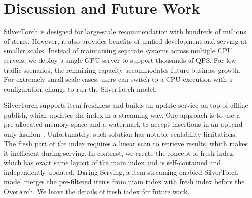\section{Discussion and Future Work}
\label{sec:7}
SilverTorch is designed for large-scale recommendation with hundreds of millions of items. However, it also provides benefits of unified development and serving at smaller scales. Instead of maintaining separate systems across multiple CPU servers, we deploy a single GPU server to support thousands of QPS. For low-traffic scenarios, the remaining capacity accommodates future business growth. For extremely small-scale cases, users can switch to a CPU execution with a configuration change to run the SilverTorch model.

SilverTorch supports item freshness and builds an update service on top of offline publish, which updates the index in a streaming way. One approach is to use a pre-allocated memory space and a watermark to accept insertions in an append-only fashion~\cite{borisyuk2024linr}. Unfortunately, such solution has notable scalability limitations. The fresh part of the index requires a linear scan to retrieve results, which makes it inefficient during serving. In contrast, we create the concept of fresh index, which has exact same layout of the main index and is self-contained and independently updated. During Serving, a item streaming enabled SilverTorch model merges the pre-filtered items from main index with fresh index before the OverArch. We leave the details of fresh index for future work.
